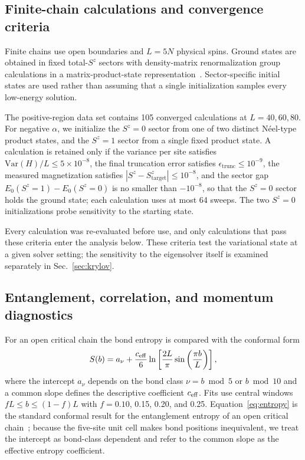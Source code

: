 \subsection{Finite-chain calculations and convergence criteria}
\label{sec:convergence}

Finite chains use open boundaries and $L=5N$ physical spins.
Ground states are obtained in fixed total-$S^z$ sectors with density-matrix
renormalization group calculations in a matrix-product-state
representation~\cite{white1992,schollwoeck2005,schollwoeck2011}.
Sector-specific initial states are used rather than assuming that a single
initialization samples every low-energy solution.

The positive-region data set contains 105 converged calculations at
$L=40,60,80$.
For negative $\alpha$, we initialize the $S^z=0$ sector from one of two distinct
N\'eel-type product states, and the $S^z=1$ sector from a single fixed product
state.
A calculation is retained only if the variance per site satisfies
$\mathrm{Var}(H)/L\le5\times10^{-8}$, the final truncation error satisfies
$\epsilon_{\mathrm{trunc}}\le10^{-9}$, the measured magnetization satisfies
$|S^z-S^z_{\mathrm{target}}|\le10^{-8}$, and the sector gap
$E_0(S^z=1)-E_0(S^z=0)$ is no smaller than $-10^{-8}$, so that the $S^z=0$ sector
holds the ground state; each calculation uses at most 64 sweeps.
The two $S^z=0$ initializations probe sensitivity to the starting state.

Every calculation was re-evaluated before use, and only calculations that pass
these criteria enter the analysis below.
These criteria test the variational state at a given solver setting; the
sensitivity to the eigensolver itself is examined separately in
Sec.~\ref{sec:krylov}.

\subsection{Entanglement, correlation, and momentum diagnostics}
\label{sec:diagnostics}

For an open critical chain the bond entropy is compared with the conformal form
\begin{equation}
S(b)=a_\nu+\frac{c_{\mathrm{eff}}}{6}
\ln\left[\frac{2L}{\pi}\sin\left(\frac{\pi b}{L}\right)\right],
\label{eq:entropy}
\end{equation}
where the intercept $a_\nu$ depends on the bond class $\nu=b\bmod 5$ or $b\bmod 10$
and a common slope defines the descriptive coefficient $c_{\mathrm{eff}}$.
Fits use central windows $fL\le b\le(1-f)L$ with $f=0.10$, 0.15, 0.20, and 0.25.
Equation~\eqref{eq:entropy} is the standard conformal result for the entanglement
entropy of an open critical
chain~\cite{calabrese2004,giamarchi2003}; because the five-site unit cell makes
bond positions inequivalent, we treat the intercept as bond-class dependent and
refer to the common slope as the effective entropy coefficient.

